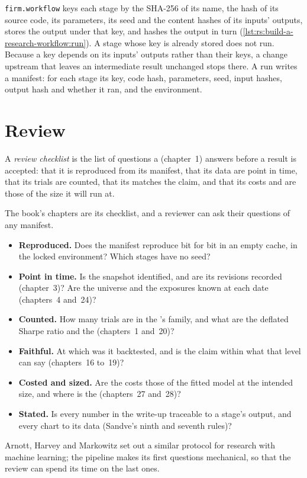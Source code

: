 \texttt{firm.workflow} keys each stage by the SHA-256 of its name, the hash of its source code, its parameters, its seed and the content hashes of its inputs'
outputs, stores the output under that key, and hashes the output in turn (\cref{lst:rs:build-a-research-workflow:run}). A stage whose key is already stored does
not run. Because a key depends on its inputs' outputs rather than their keys, a change upstream that leaves an intermediate result unchanged stops there. A run
writes a manifest: for each stage its key, code hash, parameters, seed, input hashes, output hash and whether it ran, and the environment.

\section{Review}

\begin{definition}\label{def:rs:build-a-research-workflow:review}
A \emph{review checklist} is the list of questions a  (chapter~1) answers before a result is accepted: that it is
reproduced from its manifest, that its data are point in time, that its trials are counted, that its  matches the claim, and that its costs and
 are those of the size it will run at.
\end{definition}

The book's chapters are its checklist, and a reviewer can ask their questions of any manifest.
\begin{itemize}
\item \textbf{Reproduced.} Does the manifest reproduce bit for bit in an empty cache, in the locked environment? Which stages have no seed?
\item \textbf{Point in time.} Is the snapshot identified, and are its revisions recorded (chapter~3)? Are the universe and the exposures known at each date
(chapters~4 and~24)?
\item \textbf{Counted.} How many trials are in the 's family, and what are the deflated Sharpe ratio and the 
(chapters~1 and~20)?
\item \textbf{Faithful.} At which  was it backtested, and is the claim within what that level can say (chapters~16 to~19)?
\item \textbf{Costed and sized.} Are the costs those of the fitted model at the intended size, and where is the  (chapters~27 and~28)?
\item \textbf{Stated.} Is every number in the write-up traceable to a stage's output, and every chart to its data (Sandve's ninth and seventh rules)?
\end{itemize}
Arnott, Harvey and Markowitz set out a similar protocol for research with machine learning; the pipeline makes its first questions mechanical, so that the review
can spend its time on the last ones.

